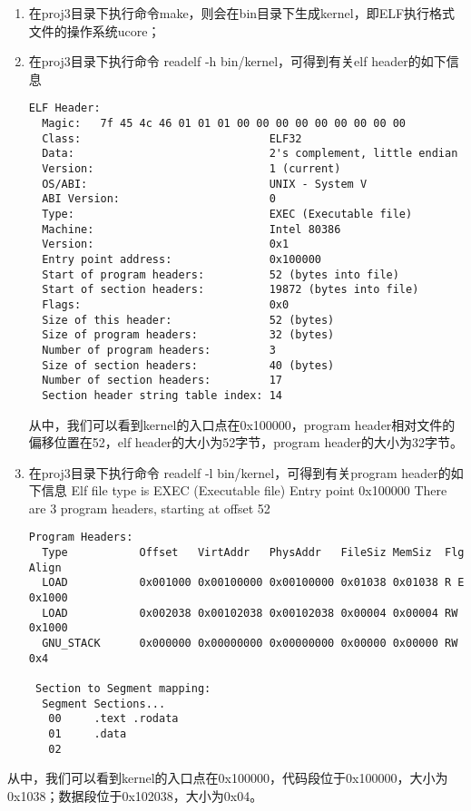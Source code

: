 \begin{enumerate}
\def\labelenumi{\arabic{enumi}.}
\item
  在proj3目录下执行命令make，则会在bin目录下生成kernel，即ELF执行格式文件的操作系统ucore；
\item
  在proj3目录下执行命令 readelf -h bin/kernel，可得到有关elf
  header的如下信息

\begin{lstlisting}
ELF Header:
  Magic:   7f 45 4c 46 01 01 01 00 00 00 00 00 00 00 00 00 
  Class:                             ELF32
  Data:                              2's complement, little endian
  Version:                           1 (current)
  OS/ABI:                            UNIX - System V
  ABI Version:                       0
  Type:                              EXEC (Executable file)
  Machine:                           Intel 80386
  Version:                           0x1
  Entry point address:               0x100000
  Start of program headers:          52 (bytes into file)
  Start of section headers:          19872 (bytes into file)
  Flags:                             0x0
  Size of this header:               52 (bytes)
  Size of program headers:           32 (bytes)
  Number of program headers:         3
  Size of section headers:           40 (bytes)
  Number of section headers:         17
  Section header string table index: 14
\end{lstlisting}

  从中，我们可以看到kernel的入口点在0x100000，program
  header相对文件的偏移位置在52，elf header的大小为52字节，program
  header的大小为32字节。
\item
  在proj3目录下执行命令 readelf -l bin/kernel，可得到有关program
  header的如下信息 Elf file type is EXEC (Executable file) Entry point
  0x100000 There are 3 program headers, starting at offset 52

\begin{lstlisting}
Program Headers:
  Type           Offset   VirtAddr   PhysAddr   FileSiz MemSiz  Flg Align
  LOAD           0x001000 0x00100000 0x00100000 0x01038 0x01038 R E 0x1000
  LOAD           0x002038 0x00102038 0x00102038 0x00004 0x00004 RW  0x1000
  GNU_STACK      0x000000 0x00000000 0x00000000 0x00000 0x00000 RW  0x4

 Section to Segment mapping:
  Segment Sections...
   00     .text .rodata 
   01     .data 
   02     
\end{lstlisting}
\end{enumerate}

从中，我们可以看到kernel的入口点在0x100000，代码段位于0x100000，大小为0x1038；数据段位于0x102038，大小为0x04。

